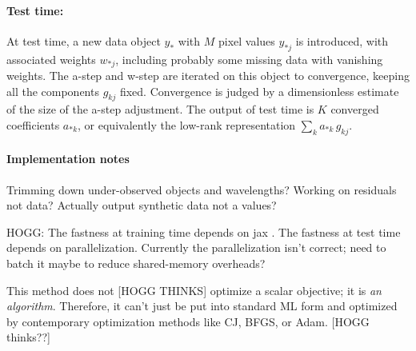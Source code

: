 \documentclass{article}
\begin{document}
\paragraph{Test time:}
At test time, a new data object $y_\ast$ with $M$ pixel values $y_{\ast j}$ is introduced, with associated weights $w_{\ast j}$, including probably some missing data with vanishing weights.
The a-step and w-step are iterated on this object to convergence, keeping all the components $g_{kj}$ fixed.
Convergence is judged by a dimensionless estimate of the size of the a-step adjustment.
The output of test time is $K$ converged coefficients $a_{\ast k}$, or equivalently the low-rank representation $\sum_k a_{\ast k}\,g_{kj}$.

\paragraph{Implementation notes}
Trimming down under-observed objects and wavelengths?
Working on residuals not data?
Actually output synthetic data not a values?

HOGG: The fastness at training time depends on jax \cite{jax}.
The fastness at test time depends on parallelization.
Currently the parallelization isn't correct; need to batch it maybe to reduce shared-memory overheads?

This method does not [HOGG THINKS] optimize a scalar objective; it is \emph{an algorithm}.
Therefore, it can't just be put into standard ML form and optimized by contemporary optimization methods like CJ, BFGS, or Adam.
[HOGG thinks??]

\raggedright\footnotesize


\end{document}
